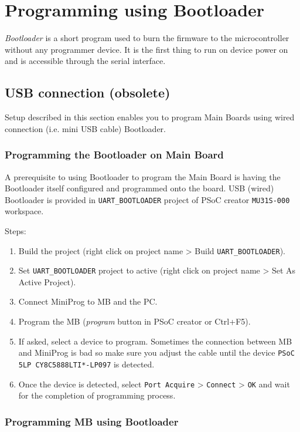 \chapter{Programming using Bootloader}

\emph{Bootloader} is a short program used to burn the firmware to the microcontroller without any programmer device. It is the first thing to run on device power on and is accessible through the serial interface.

\section{USB connection (obsolete)}

Setup described in this section enables you to program Main Boards using wired connection (i.e. mini USB cable) Bootloader.

\subsection{Programming the Bootloader on Main Board}
\label{subsec:programming_the_bootloader}

A prerequisite to using Bootloader to program the Main Board is having the Bootloader itself configured and programmed onto the board. USB (wired) Bootloader is provided in \texttt{UART\_BOOTLOADER} project of PSoC creator \texttt{MU31S-000} workspace.

Steps:
\begin{enumerate}
	\item Build the project (right click on project name > Build \texttt{UART\_BOOTLOADER}).
	\item Set \texttt{UART\_BOOTLOADER} project to active (right click on project name > Set As Active Project).
	\item Connect MiniProg to MB and the PC.
	\item Program the MB (\textit{program} button in PSoC creator or Ctrl+F5).
	\item If asked, select a device to program. Sometimes the connection between MB and MiniProg is bad so make sure you adjust the cable until the device \texttt{PSoC 5LP CY8C5888LTI*-LP097} is detected. %
	\item Once the device is detected, select \texttt{Port Acquire} > \texttt{Connect} > \texttt{OK} and wait for the completion of programming process.
\end{enumerate}

\subsection{Programming MB using Bootloader}
\label{subsec:programming_with_bootloader}

